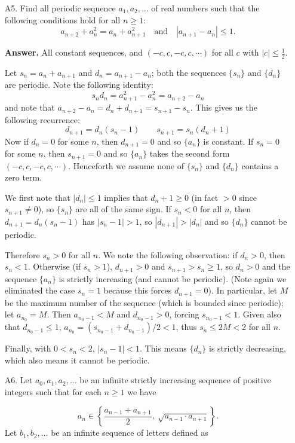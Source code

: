 \documentclass[11pt,a4paper]{article}
\begin{document}
\begin{enumerate}
		\item [A5.] 
		Find all periodic sequence $a_1,a_2,\dots$ of real numbers such that the following conditions hold for all $n\geqslant 1$:$$a_{n+2}+a_{n}^2=a_n+a_{n+1}^2\quad\text{and}\quad |a_{n+1}-a_n|\leqslant 1.$$
		
		\textbf{Answer.} All constant sequences, 
		and $(-c, c, -c, c, \cdots)$ for all $c$ with $|c|\le \frac 12$. 
		
		Let $s_n = a_n+a_{n+1}$ and $d_n = a_{n+1}-a_n$; 
		both the sequences $\{s_n\}$ and $\{d_n\}$ are periodic. 
		Note the following identity:
		\[
		s_nd_n = a_{n+1}^2-a_n^2=a_{n+2}-a_n
		\]
		and note that 
		$a_{n+2}-a_n=d_n+d_{n+1}=s_{n+1}-s_n$. 
		This gives us the following recurrence: 
		\[
		d_{n+1} = d_n(s_n-1)
		\qquad 
		s_{n+1}=s_n(d_n+1)
		\]
		Now if $d_n=0$ for some $n$, then $d_{n+1}=0$ and so $\{a_n\}$ is constant. 
		If $s_n=0$ for some $n$, then $s_{n+1}=0$ and so 
		$\{a_n\}$ takes the second form $(-c, c, -c, c, \cdots)$. 
		Henceforth we assume none of $\{s_n\}$ and $\{d_n\}$ contains a zero term. 
		
		We first note that $|d_n|\le 1$ implies that 
		$d_n+1\ge 0$ (in fact $>0$ since $s_{n+1}\neq 0$), 
		so $\{s_n\}$ are all of the same sign. 
		If $s_n<0$ for all $n$, 
		then $d_{n+1} = d_n(s_n-1)$ has 
		$|s_n-1| > 1$, so 
		$|d_{n+1}| > |d_n|$ and so $\{d_n\}$ cannot be periodic. 
		
		Therefore $s_n>0$ for all $n$. 
		We note the following observation: 
		if $d_n > 0$, then $s_n < 1$. 
		Otherwise (if $s_n>1$), $d_{n+1}>0$ and $s_{n+1}>s_n\ge 1$,
		so $d_n > 0$ and the sequence $\{a_n\}$ is strictly increasing (and cannot be periodic). 
		(Note again we eliminated the case $s_n=1$ because this forces $d_{n+1}=0$). 
		In particular, let $M$ be the maximum number of the sequence 
		(which is bounded since periodic); 
		let $a_{n_0}=M$. 
		Then $a_{n_0-1}<M$ and $d_{n_0-1}>0$, 
		forcing $s_{n_0-1}< 1$. 
		Given also that $d_{n_0-1}\le 1$, 
		$a_{n_0}=(s_{n_0-1}+d_{n_0-1})/2< 1$, 
		thus $s_n\le 2M < 2$ for all $n$. 
		
		Finally, with $0< s_n< 2$, 
		$|s_n-1|<1$. 
		This means $\{d_{n}\}$ is strictly decreasing, 
		which also means it cannot be periodic. 
		
		\item [A6.]
		Let $a_0, a_1, a_2, \ldots$ be an infinite strictly increasing sequence of positive integers such that for each $n \ge 1$ we have
		
		$$
		a_n \in \left\{ \frac{a_{n-1} + a_{n+1}}{2},\ \sqrt{a_{n-1} \cdot a_{n+1}} \right\}.
		$$Let $b_1, b_2, \ldots$ be an infinite sequence of letters defined as
		

\end{enumerate}
\end{document}
